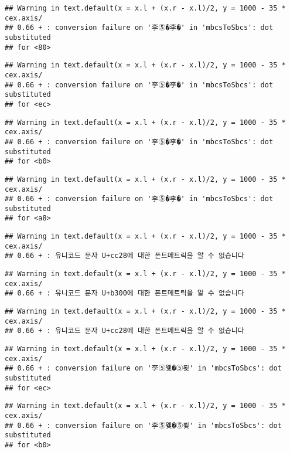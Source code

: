 \documentclass[]{article}
\begin{document}
\begin{verbatim}
## Warning in text.default(x = x.l + (x.r - x.l)/2, y = 1000 - 35 * cex.axis/
## 0.66 + : conversion failure on '李⑤�李�' in 'mbcsToSbcs': dot substituted
## for <80>
\end{verbatim}

\begin{verbatim}
## Warning in text.default(x = x.l + (x.r - x.l)/2, y = 1000 - 35 * cex.axis/
## 0.66 + : conversion failure on '李⑤�李�' in 'mbcsToSbcs': dot substituted
## for <ec>
\end{verbatim}

\begin{verbatim}
## Warning in text.default(x = x.l + (x.r - x.l)/2, y = 1000 - 35 * cex.axis/
## 0.66 + : conversion failure on '李⑤�李�' in 'mbcsToSbcs': dot substituted
## for <b0>
\end{verbatim}

\begin{verbatim}
## Warning in text.default(x = x.l + (x.r - x.l)/2, y = 1000 - 35 * cex.axis/
## 0.66 + : conversion failure on '李⑤�李�' in 'mbcsToSbcs': dot substituted
## for <a8>
\end{verbatim}

\begin{verbatim}
## Warning in text.default(x = x.l + (x.r - x.l)/2, y = 1000 - 35 * cex.axis/
## 0.66 + : 유니코드 문자 U+cc28에 대한 폰트메트릭을 알 수 없습니다
\end{verbatim}

\begin{verbatim}
## Warning in text.default(x = x.l + (x.r - x.l)/2, y = 1000 - 35 * cex.axis/
## 0.66 + : 유니코드 문자 U+b300에 대한 폰트메트릭을 알 수 없습니다
\end{verbatim}

\begin{verbatim}
## Warning in text.default(x = x.l + (x.r - x.l)/2, y = 1000 - 35 * cex.axis/
## 0.66 + : 유니코드 문자 U+cc28에 대한 폰트메트릭을 알 수 없습니다
\end{verbatim}

\begin{verbatim}
## Warning in text.default(x = x.l + (x.r - x.l)/2, y = 1000 - 35 * cex.axis/
## 0.66 + : conversion failure on '李⑤웾�⑤룆' in 'mbcsToSbcs': dot substituted
## for <ec>
\end{verbatim}

\begin{verbatim}
## Warning in text.default(x = x.l + (x.r - x.l)/2, y = 1000 - 35 * cex.axis/
## 0.66 + : conversion failure on '李⑤웾�⑤룆' in 'mbcsToSbcs': dot substituted
## for <b0>
\end{verbatim}
\end{document}
